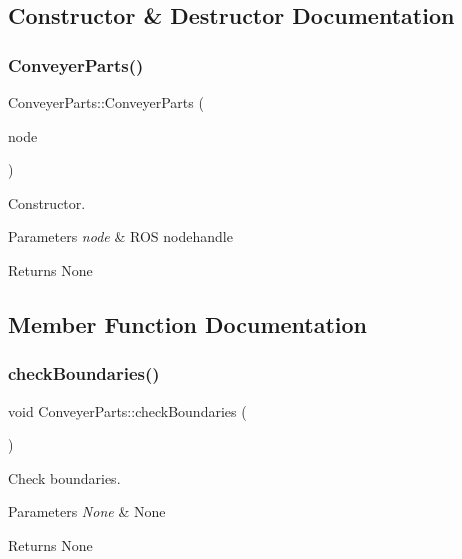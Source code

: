 \subsection{Constructor \& Destructor Documentation}
\mbox{\label{classConveyerParts_a0b511cdd3b2d0c0587901b1443f43d49}} 
\subsubsection{\texorpdfstring{Conveyer\+Parts()}{ConveyerParts()}}
{\footnotesize\ttfamily Conveyer\+Parts\+::\+Conveyer\+Parts (\begin{DoxyParamCaption}\item[{ros\+::\+Node\+Handle \&}]{node }\end{DoxyParamCaption})}



Constructor. 


\begin{DoxyParams}{Parameters}
{\em node} & R\+OS nodehandle \\
\hline
\end{DoxyParams}
\begin{DoxyReturn}{Returns}
None 
\end{DoxyReturn}


\subsection{Member Function Documentation}
\mbox{\label{classConveyerParts_a1a9fca855f6455ba350de65acab56051}} 
\subsubsection{\texorpdfstring{check\+Boundaries()}{checkBoundaries()}}
{\footnotesize\ttfamily void Conveyer\+Parts\+::check\+Boundaries (\begin{DoxyParamCaption}{ }\end{DoxyParamCaption})}



Check boundaries. 


\begin{DoxyParams}{Parameters}
{\em None} & None \\
\hline
\end{DoxyParams}
\begin{DoxyReturn}{Returns}
None 
\end{DoxyReturn}
\mbox{\label{classConveyerParts_a8fb0ac9bde6ae5ffea922768e68026a2}} 
